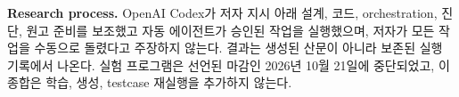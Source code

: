\documentclass[10pt,conference]{IEEEtran}
\begin{document}
\noindent\textbf{Research process.} OpenAI Codex가 저자 지시 아래 설계, 코드, orchestration, 진단, 원고 준비를 보조했고 자동 에이전트가 승인된 작업을 실행했으며, 저자가 모든 작업을 수동으로 돌렸다고 주장하지 않는다. 결과는 생성된 산문이 아니라 보존된 실행 기록에서 나온다. 실험 프로그램은 선언된 마감인 2026년 10월 21일에 중단되었고, 이 종합은 학습, 생성, testcase 재실행을 추가하지 않는다.

\clearpage
{}


\end{document}
